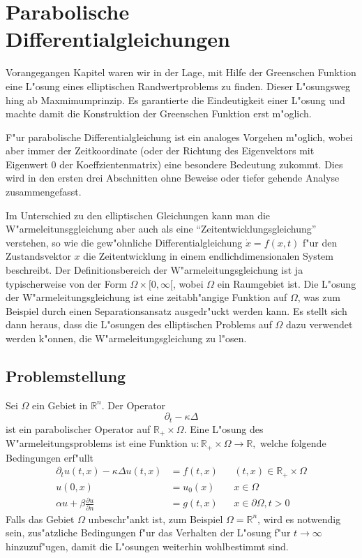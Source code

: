 %
%
%
\chapter{Parabolische Differentialgleichungen\label{chapter-parabolisch}}
\rhead{}
Vorangegangen Kapitel waren wir in der Lage, mit Hilfe der Greenschen
Funktion eine L"osung eines elliptischen Randwertproblems zu finden.
Dieser L"osungsweg hing ab Maxmimumprinzip.
Es garantierte die Eindeutigkeit einer
L"osung und machte damit die Konstruktion der Greenschen Funktion
erst m"oglich.

F"ur parabolische Differentialgleichung ist ein analoges Vorgehen
m"oglich, wobei aber immer der Zeitkoordinate (oder der Richtung
des Eigenvektors mit Eigenwert $0$ der Koeffzientenmatrix)
eine besondere Bedeutung zukommt.
Dies wird in den ersten drei
Abschnitten ohne Beweise  oder tiefer gehende Analyse zusammengefasst.

Im Unterschied zu den elliptischen
Gleichungen kann man die W"armeleitunsggleichung aber auch
als eine ``Zeitentwicklungsgleichung'' verstehen, so wie die
gew"ohnliche Differentialgleichung $\dot x=f(x,t)$
f"ur den Zustandsvektor $x$ die Zeitentwicklung in einem endlichdimensionalen
System beschreibt. Der Definitionsbereich der W"armeleitungsgleichung
ist ja typischerweise von der Form $\Omega\times[0,\infty[$, wobei
$\Omega$ ein Raumgebiet ist.
Die L"osung der W"armeleitungsgleichung ist eine zeitabh"angige Funktion
auf $\Omega$, was zum Beispiel durch einen Separationsansatz
ausgedr"uckt werden kann. Es stellt sich dann heraus, dass die L"osungen
des elliptischen Problems auf $\Omega$ dazu verwendet werden k"onnen,
die W"armeleitungsgleichung zu l"osen.

\section{Problemstellung}
Sei $\Omega$ ein Gebiet in $\mathbb R^n$. Der Operator 
\[
\partial_t-\kappa\Delta
\]
ist ein parabolischer Operator auf $\mathbb R_+\times \Omega$.
Eine L"osung des W"armeleitungsproblems ist eine Funktion
$u\colon\mathbb R_+\times\Omega\to\mathbb R,$
welche folgende Bedingungen erf"ullt
\begin{align*}
\partial_tu(t,x)-\kappa\Delta u(t,x)&=f(t,x)&&(t,x)\in\mathbb R_+\times\Omega
\\
u(0,x)&=u_0(x)&&x\in\Omega
\\
\alpha u+\beta\frac{\partial u}{\partial n}&=g(t, x)&&x\in\partial\Omega, t>0
\end{align*}
Falls das Gebiet $\Omega$ unbeschr"ankt ist, zum Beispiel $\Omega=\mathbb R^n$,
wird es notwendig sein, zus"atzliche Bedingungen f"ur das Verhalten
der L"osung f"ur $t\to\infty$ hinzuzuf"ugen, damit die L"osungen weiterhin
wohlbestimmt sind.

